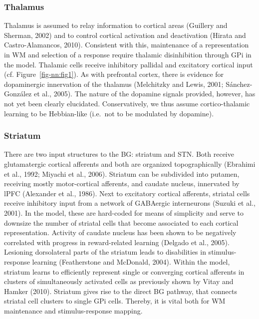 \documentclass[
  11pt,
  a4paper,
]{scrbook}
\begin{document}
\subsubsection*{Thalamus}\label{thalamus}

Thalamus is assumed to relay information to cortical areas (Guillery and
Sherman, 2002) and to control cortical activation and deactivation
(Hirata and Castro-Alamancos, 2010). Consistent with this, maintenance
of a representation in WM and selection of a response require thalamic
disinhibition through GPi in the model. Thalamic cells receive
inhibitory pallidal and excitatory cortical input (cf.
Figure~\ref{fig-nn:fig1}). As with prefrontal cortex, there is evidence
for dopaminergic innervation of the thalamus (Melchitzky and Lewis,
2001; Sánchez-González et al., 2005). The nature of the dopamine signals
provided, however, has not yet been clearly elucidated. Conservatively,
we thus assume cortico-thalamic learning to be Hebbian-like (i.e.~not to
be modulated by dopamine).

\subsubsection*{Striatum}\label{striatum}

There are two input structures to the BG: striatum and STN. Both receive
glutamatergic cortical afferents and both are organized topographically
(Ebrahimi et al., 1992; Miyachi et al., 2006). Striatum can be
subdivided into putamen, receiving mostly motor-cortical afferents, and
caudate nucleus, innervated by lPFC (Alexander et al., 1986). Next to
excitatory cortical afferents, striatal cells receive inhibitory input
from a network of GABAergic interneurons (Suzuki et al., 2001). In the
model, these are hard-coded for means of simplicity and serve to
downsize the number of striatal cells that become associated to each
cortical representation. Activity of caudate nucleus has been shown to
be negatively correlated with progress in reward-related learning
(Delgado et al., 2005). Lesioning dorsolateral parts of the striatum
leads to disabilities in stimulus-response learning (Featherstone and
McDonald, 2004). Within the model, striatum learns to efficiently
represent single or converging cortical afferents in clusters of
simultaneously activated cells as previously shown by Vitay and Hamker
(2010). Striatum gives rise to the direct BG pathway, that connects
striatal cell clusters to single GPi cells. Thereby, it is vital both
for WM maintenance and stimulus-response mapping.
\end{document}
